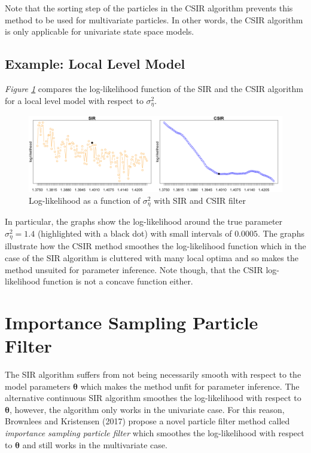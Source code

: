 \documentclass[11pt, oneside]{scrreprt}   	%
\begin{document}
Note that the sorting step of the particles in the CSIR algorithm prevents this method to be used for multivariate particles. In other words, the CSIR algorithm is only applicable for univariate state space models.\\

\subsection{Example: Local Level Model}
\textit{Figure \ref{fig:ullm-loglik-zoom-2}} compares the log-likelihood function of the SIR and the CSIR algorithm for a local level model with respect to $\sigma_{\eta}^2$. 

\begin{figure}[h!]
\centering
\includegraphics[width=145mm]{../../images/ullm-loglik-zoom-2.png}
\caption{Log-likelihood as a function of $\sigma_{\eta}^2$ with SIR and CSIR filter}
\label{fig:ullm-loglik-zoom-2}
\end{figure}
In particular, the graphs show the log-likelihood around the true parameter $\sigma_{\eta}^2 = 1.4$ (highlighted with a black dot) with small intervals of $0.0005$. The graphs illustrate how the CSIR method smoothes the log-likelihood function which in the case of the SIR algorithm is cluttered with many local optima and so makes the method unsuited for parameter inference. Note though, that the CSIR log-likelihood function is not a concave function either.

\section{Importance Sampling Particle Filter}
The SIR algorithm suffers from not being necessarily smooth with respect to the model parameters $\boldsymbol{\theta}$ which makes the method unfit for parameter inference. The alternative continuous SIR algorithm smoothes the log-likelihood with respect to $\boldsymbol{\theta}$, however, the algorithm only works in the univariate case. For this reason, Brownlees and Kristensen (2017) propose a novel particle filter method called \textit{importance sampling particle filter} which smoothes the log-likelihood with respect to $\boldsymbol{\theta}$ and still works in the multivariate case. \\
\end{document}
